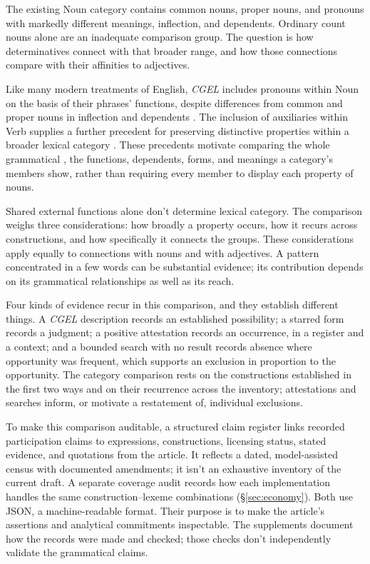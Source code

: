 \documentclass[12pt]{article}
\begin{document}
The existing Noun category contains common nouns, proper nouns, and pronouns with markedly different meanings, inflection, and dependents. Ordinary count nouns alone are an inadequate comparison group. The question is how determinatives connect with that broader range, and how those connections compare with their affinities to adjectives.

Like many modern treatments of English, \textit{CGEL} includes pronouns within Noun on the basis of their phrases' functions, despite differences from common and proper nouns in inflection and dependents \citep[327--328]{huddleston2002}. The inclusion of auxiliaries within Verb supplies a further precedent for preserving distinctive properties within a broader lexical category \citep{pullumwilson1977}. These precedents motivate comparing the whole grammatical , the functions, dependents, forms, and meanings a category's members show, rather than requiring every member to display each property of nouns.

Shared external functions alone don't determine lexical category. The comparison weighs three considerations: how broadly a property occurs, how it recurs across constructions, and how specifically it connects the groups. These considerations apply equally to connections with nouns and with adjectives. A pattern concentrated in a few words can be substantial evidence; its contribution depends on its grammatical relationships as well as its reach.

Four kinds of evidence recur in this comparison, and they establish different things. A \textit{CGEL} description records an established possibility; a starred form records a judgment; a positive attestation records an occurrence, in a register and a context; and a bounded search with no result records absence where opportunity was frequent, which supports an exclusion in proportion to the opportunity. The category comparison rests on the constructions established in the first two ways and on their recurrence across the inventory; attestations and searches inform, or motivate a restatement of, individual exclusions.

To make this comparison auditable, a structured claim register links recorded participation claims to expressions, constructions, licensing status, stated evidence, and quotations from the article. It reflects a dated, model-assisted census with documented amendments; it isn't an exhaustive inventory of the current draft. A separate coverage audit records how each implementation handles the same construction--lexeme combinations (§\ref{sec:economy}). Both use JSON, a machine-readable format. Their purpose is to make the article's assertions and analytical commitments inspectable. The supplements document how the records were made and checked; those checks don't independently validate the grammatical claims.
\end{document}
